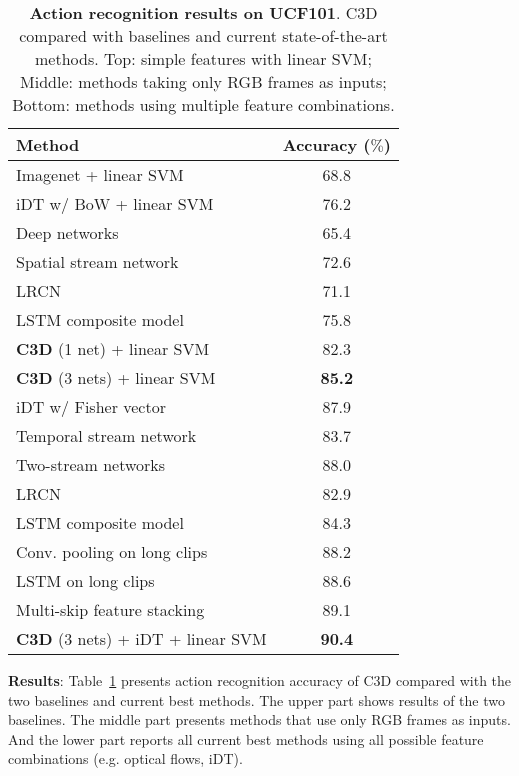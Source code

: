 \documentclass[10pt,twocolumn,letterpaper]{article}
\begin{document}
\begin{table}
\begin{center}

\begin{tabular}{|l|c|}
\hline
Method & Accuracy ($\%$) \\
\hline
Imagenet + linear SVM & 68.8 \\
iDT w/ BoW + linear SVM & 76.2 \\
\hline
Deep networks~\cite{Karpathy14} & 65.4 \\
Spatial stream network~\cite{SimonyanZ14} & 72.6 \\
LRCN~\cite{DonahueHGRVSD14} & 71.1 \\
LSTM composite model~\cite{SrivastavaMS15} & 75.8 \\
{\bf C3D} (1 net) + linear SVM & 82.3 \\
{\bf C3D} (3 nets) + linear SVM & {\bf 85.2} \\
\hline
iDT w/ Fisher vector~\cite{PengWWQ14} & 87.9\\
Temporal stream network~\cite{SimonyanZ14} & 83.7 \\
Two-stream networks~\cite{SimonyanZ14} & 88.0 \\
LRCN~\cite{DonahueHGRVSD14} & 82.9 \\
LSTM composite model~\cite{SrivastavaMS15} & 84.3 \\
Conv. pooling on long clips~\cite{Ng15} & 88.2 \\
LSTM on long clips~\cite{Ng15} & 88.6 \\
Multi-skip feature stacking~\cite{LanLLHR14} & 89.1 \\
{\bf C3D} (3 nets) + iDT + linear SVM& {\bf 90.4} \\
\hline
\end{tabular}
\end{center}
\vspace{-8pt}
\caption{{\bf Action recognition results on UCF101}. C3D compared with baselines and current state-of-the-art methods. Top: simple features with linear SVM; Middle: methods taking only RGB frames as inputs; Bottom: methods using multiple feature combinations.}
\label{tab:ucf101_result_combine}
\end{table}

{\bf Results}: Table~\ref{tab:ucf101_result_combine} presents action recognition accuracy of C3D compared with the two baselines and current best methods. The upper part shows results of the two baselines. The middle part presents methods that use only RGB frames as inputs. And the lower part reports all current best methods using all possible feature combinations (e.g. optical flows, iDT).
\end{document}
